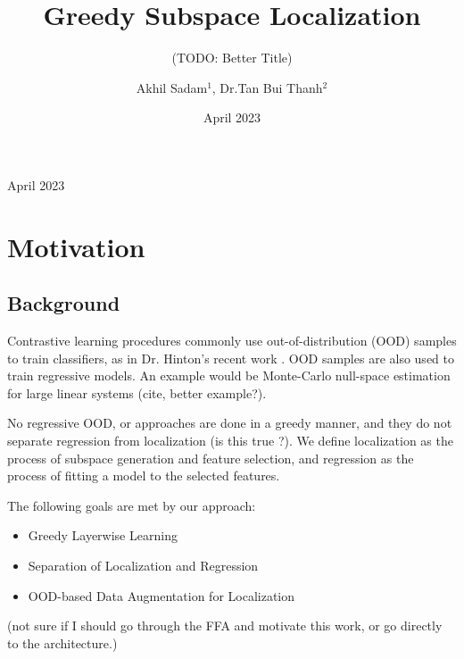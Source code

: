 \documentclass[12pt]{iopart}
\theoremstyle{break}
\begin{document}
\date{April 2023}
\title{Greedy Subspace Localization}
\subtitle{(TODO: Better Title)}
\author{Akhil Sadam$^1$, Dr.Tan Bui Thanh$^2$}
\address{$^1$Department of Aerospace Engineering and Engineering Mechanics, UT Austin\\$^2$The Oden Institute for Computational Sciences, UT Austin}
\begin{indented}
\item[]April 2023
\end{indented}
\section{Motivation}
\subsection{Background}
Contrastive learning procedures commonly use out-of-distribution (OOD) samples to train classifiers, as in Dr. Hinton's recent work \cite{FFA23}.
OOD samples are also used to train regressive models. An example would be Monte-Carlo null-space estimation for large linear systems (cite, better example?).
	
No regressive OOD, or  approaches are done in a greedy manner, and they do not separate regression from localization (is this true ?).
We define localization as the process of subspace generation and feature selection, and regression as the process of fitting a model to the selected features.
	
The following goals are met by our approach:
\begin{itemize}
\item Greedy Layerwise Learning 
\item Separation of Localization and Regression
\item OOD-based Data Augmentation for Localization
\end{itemize}
	
(not sure if I should go through the FFA and motivate this work, or go directly to the architecture.)
\end{document}
